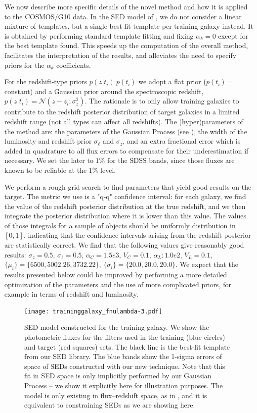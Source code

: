 \documentclass[aps,prd,showpacs,superscriptaddress,groupedaddress]{revtex4}  %
\begin{document}
We now describe more specific details of the novel method and how it is applied to the COSMOS/G10 data.
In the SED model of , we do not consider a linear mixture of templates, but a single best-fit template per training galaxy instead.
It is obtained by performing standard template fitting and fixing $\alpha_k=0$ except for the best template found. 
This speeds up the computation of the overall method, facilitates the interpretation of the results, and alleviates the need to specify priors for the $\alpha_k$ coefficients.

For the redshift-type priors $p(z | t_i) \ p(t_i)$ we adopt a flat prior ($ p(t_i) = $constant) and a Gaussian prior around the spectroscopic redshift, $p(z | t_i) = \mathcal{N}(z-z_i; \sigma^2_z)$.
The rationale is to only allow training galaxies to contribute to the redshift posterior distribution of target galaxies in a limited redshift range (\ie not all types can affect all redshifts).
The (hyper)parameters of the method are: the parameters of the Gaussian Process (see ), the width of the luminosity and redshift prior $\sigma_\ell$ and $\sigma_z$,  and an extra fractional error which is added in quadrature to all flux errors to compensate for their underestimation if necessary.
We set the later to $1\%$ for the SDSS bands, since those fluxes are known to be reliable at the $1\%$ level.

We perform a rough grid search to find parameters that yield good results on the target.
The metric we use is a "q-q" confidence interval: for each galaxy, we find the value of the redshift posterior distribution at the true redshift, and we then integrate the posterior distribution where it is lower than this value.
The values of those integrals for a sample of objects should be uniformly distribution in $[0, 1]$, indicating that the confidence intervals arising from the redshift posterior are statistically correct. 
We find that the following values give reasonably good results: 
$\sigma_z = 0.5$, 
$\sigma_\ell = 0.5$,
$\alpha_C= 1.5e3$,
$V_C= 0.1$,
$\alpha_L: 1.0e2$,
$V_L= 0.1$,
$\{\mu_i\} = \{ 6500, 5002.26, 3732.22 \}$,
$\{\sigma_i\} = \{ 20.0, 20.0, 20.0 \}$.
We expect that the results presented below could be improved by performing a more detailed optimization of the parameters and the use of more complicated priors, for example in terms of redshift and luminosity.



\begin{figure}
\texttt{[image: traininggalaxy\_fnulambda-3.pdf]}
\caption{SED model constructed for the training galaxy. We show the photometric fluxes for the filters used in the training (blue circles) and target (red squares) sets. The black line is the best-fit template from our SED library. The blue bands show the 1-sigma errors of space of SEDs constructed with our new technique. Note that this fit in SED space is only implicitly performed by our Gaussian Process -- we show it explicitly here for illustration purposes. The model is only existing in flux--redshift space, as in , and it is equivalent to constraining SEDs as we are showing here.}
\label{fig:traininggalaxy_fnulambda}
\end{figure}
\end{document}
